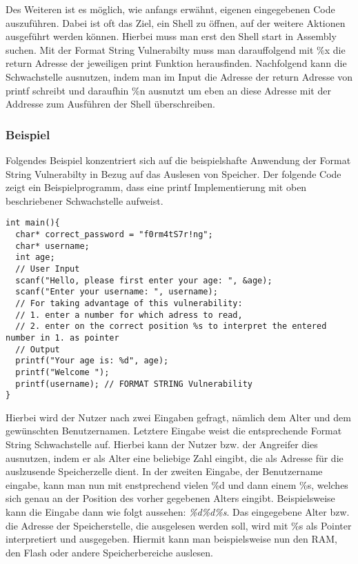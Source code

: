 \documentclass[a4paper,
DIV=13,
12pt,
BCOR=10mm,
department=FakIM,
oneside,
parskip=half,
automark,
listof=totocnumbered,
bibliography=totocnumbered,
acronym=totocnumbered
] {OTHRartcl}
\begin{document}
Des Weiteren ist es möglich, wie anfangs erwähnt, eigenen eingegebenen Code auszuführen. Dabei ist oft das Ziel,
ein Shell zu öffnen, auf der weitere Aktionen ausgeführt werden können.
Hierbei muss man erst den Shell start in Assembly suchen. Mit der Format String Vulnerabilty muss man darauffolgend mit \%x die return Adresse
der jeweiligen print Funktion herausfinden. Nachfolgend kann die Schwachstelle ausnutzen, indem man im Input die Adresse der return Adresse von printf schreibt
und daraufhin \%n ausnutzt um eben an diese Adresse mit der Addresse zum Ausführen der Shell überschreiben.

\subsubsection{Beispiel}
Folgendes Beispiel konzentriert sich auf die beispielshafte Anwendung der Format String Vulnerabilty in Bezug auf das Auslesen von Speicher.
Der folgende Code zeigt ein Beispielprogramm, dass eine printf Implementierung mit oben beschriebener Schwachstelle aufweist.
\begin{verbatim}
int main(){
  char* correct_password = "f0rm4tS7r!ng";
  char* username;
  int age;
  // User Input
  scanf("Hello, please first enter your age: ", &age);
  scanf("Enter your username: ", username);
  // For taking advantage of this vulnerability:
  // 1. enter a number for which adress to read,
  // 2. enter on the correct position %s to interpret the entered number in 1. as pointer
  // Output
  printf("Your age is: %d", age);
  printf("Welcome ");
  printf(username); // FORMAT STRING Vulnerability
}
\end{verbatim}
Hierbei wird der Nutzer nach zwei Eingaben gefragt, nämlich dem Alter und dem gewünschten Benutzernamen.
Letztere Eingabe weist die entsprechende Format String Schwachstelle auf.
Hierbei kann der Nutzer bzw. der Angreifer dies ausnutzen, indem er als Alter eine beliebige Zahl eingibt, die als Adresse für die auslzusende Speicherzelle dient.
In der zweiten Eingabe, der Benutzername eingabe, kann man nun mit enstprechend vielen \%d und dann einem \%s, welches sich genau an der Position des
vorher gegebenen Alters eingibt. Beispielsweise kann die Eingabe dann wie folgt aussehen: \textit{\%d\%d\%s}.
Das eingegebene Alter bzw. die Adresse der Speicherstelle, die ausgelesen werden soll, wird mit \%s als Pointer interpretiert und ausgegeben.
Hiermit kann man beispielsweise nun den RAM, den Flash oder andere Speicherbereiche auslesen.
\end{document}
